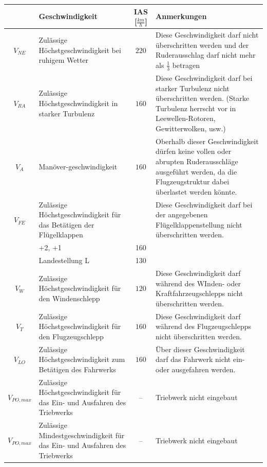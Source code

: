 \begin{longtable}{|c|p{3cm}|c|p{4cm}|}
\hline
& Geschwindigkeit & IAS [$\frac{km}{h}$] & Anmerkungen \\
\hline
$V_{NE}$ & Zulässige Höchstgeschwindigkeit bei ruhigem Wetter & $220$ & Diese Geschwindigkeit darf nicht überschritten werden und der Ruderausschlag darf nicht mehr als $\frac{1}{3}$ betragen\\
\hline
$V_{RA}$ & Zulässige Höchstgeschwindigkeit in starker Turbulenz & $160$ & Diese Geschwindigkeit darf bei starker Turbulenz nicht überschritten werden. (Starke Turbulenz herrscht vor in Leewellen-Rotoren, Gewitterwolken, usw.) \\
\hline
$V_A$ & Manöver-\newline geschwindigkeit & $160$ & Oberhalb dieser Geschwindigkeit dürfen keine vollen oder abrupten Ruderausschläge ausgeführt werden, da die Flugzeugstruktur dabei überlastet werden könnte.\\
\hline
$V_{FE}$ & Zulässige Höchstgeschwindigkeit für das Betätigen der Flügelklappen
&   & Diese Geschwindigkeit darf bei der angegebenen Flügelklappenstellung nicht überschritten werden.\\
& +2, +1 & 160 & \\
& Landestellung L & 130 & \\
\hline
$V_W$ & Zulässige Höchstgeschwindigkeit für den Windenschlepp & $120$ & Diese Geschwindigkeit darf während des WInden- oder Kraftfahrzeugschlepps nicht überschritten werden.\\
\hline
$V_T$ & Zulässige Höchstgeschwindigkeit für den Flugzeugschlepp & $160$ & Diese Geschwindigkeit darf während des Flugzeugschlepps nicht überschritten werden.\\
\hline
$V_{LO}$ & Zulässige Höchstgeschwindigkeit zum Betätigen des Fahrwerks & $160$ & Über dieser Geschwindigkeit darf das Fahrwerk nicht ein- oder ausgefahren werden.\\
\hline
$V_{PO,max}$ & Zulässige Höchstgeschwindigkeit für das Ein- und Ausfahren des Triebwerks & -- & Triebwerk nicht eingebaut\\
\hline
$V_{PO,max}$ & Zulässige Mindestgeschwindigkeit für das Ein- und Ausfahren des Triebwerks & -- & Triebwerk nicht eingebaut\\
\hline
\end{longtable}
\newpage
